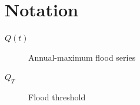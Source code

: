 \documentclass[12pt]{article}
\begin{document}
\section{Notation}

\begin{description}
  \item[\(Q(t)\)] Annual-maximum flood series
  \item[\(Q_T\)] Flood threshold
\end{description}


\clearpage
\printbibliography{}
\end{document}
